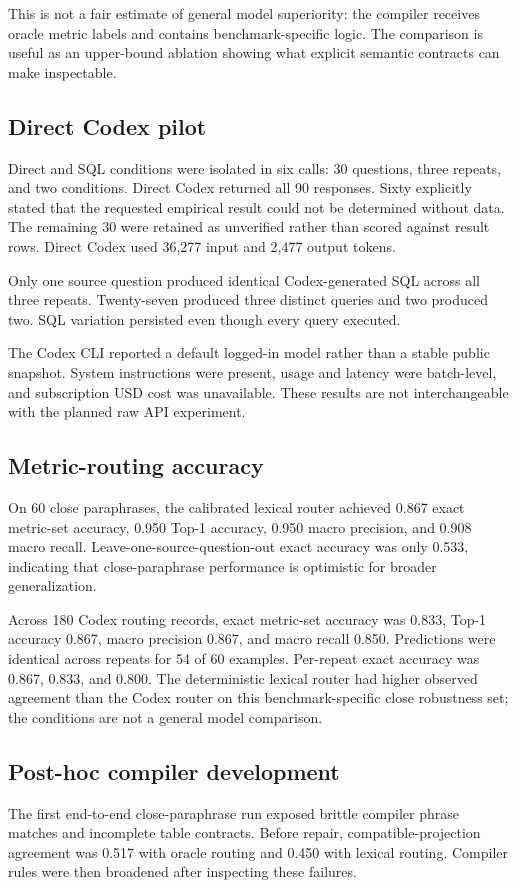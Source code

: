 \documentclass[11pt]{article}
\begin{document}
This is not a fair estimate of general model superiority: the compiler receives
oracle metric labels and contains benchmark-specific logic. The comparison is
useful as an upper-bound ablation showing what explicit semantic contracts can
make inspectable.

\subsection{Direct Codex pilot}
Direct and SQL conditions were isolated in six calls: 30 questions, three
repeats, and two conditions. Direct Codex returned all 90 responses. Sixty
explicitly stated that the requested empirical result could not be determined
without data. The remaining 30 were retained as unverified rather than scored
against result rows. Direct Codex used 36,277 input and 2,477 output tokens.

Only one source question produced identical Codex-generated SQL across all three
repeats. Twenty-seven produced three distinct queries and two produced two. SQL
variation persisted even though every query executed.

The Codex CLI reported a default logged-in model rather than a stable public
snapshot. System instructions were present, usage and latency were batch-level,
and subscription USD cost was unavailable. These results are not interchangeable
with the planned raw API experiment.

\subsection{Metric-routing accuracy}
On 60 close paraphrases, the calibrated lexical router achieved 0.867 exact
metric-set accuracy, 0.950 Top-1 accuracy, 0.950 macro precision, and 0.908 macro
recall. Leave-one-source-question-out exact accuracy was only 0.533, indicating
that close-paraphrase performance is optimistic for broader generalization.

Across 180 Codex routing records, exact metric-set accuracy was 0.833, Top-1
accuracy 0.867, macro precision 0.867, and macro recall 0.850. Predictions were
identical across repeats for 54 of 60 examples. Per-repeat exact accuracy was
0.867, 0.833, and 0.800. The deterministic lexical router had higher observed
agreement than the Codex router on this benchmark-specific close robustness set;
the conditions are not a general model comparison.

\subsection{Post-hoc compiler development}
The first end-to-end close-paraphrase run exposed brittle compiler phrase matches
and incomplete table contracts. Before repair, compatible-projection agreement
was 0.517 with oracle routing and 0.450 with lexical routing. Compiler rules were
then broadened after inspecting these failures.
\end{document}
